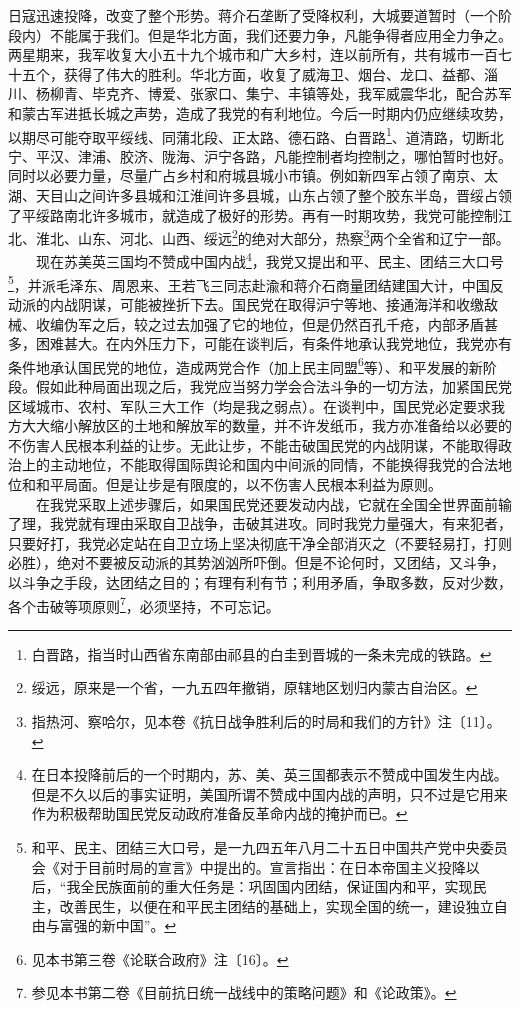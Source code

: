 \documentclass[cn,11pt,chinese]{elegantbook}
\begin{document}
日寇迅速投降，改变了整个形势。蒋介石垄断了受降权利，大城要道暂时（一个阶段内）不能属于我们。但是华北方面，我们还要力争，凡能争得者应用全力争之。两星期来，我军收复大小五十九个城市和广大乡村，连以前所有，共有城市一百七十五个，获得了伟大的胜利。华北方面，收复了威海卫、烟台、龙口、益都、淄川、杨柳青、毕克齐、博爱、张家口、集宁、丰镇等处，我军威震华北，配合苏军和蒙古军进抵长城之声势，造成了我党的有利地位。今后一时期内仍应继续攻势，以期尽可能夺取平绥线、同蒲北段、正太路、德石路、白晋路\footnote[1]{ 白晋路，指当时山西省东南部由祁县的白圭到晋城的一条未完成的铁路。}、道清路，切断北宁、平汉、津浦、胶济、陇海、沪宁各路，凡能控制者均控制之，哪怕暂时也好。同时以必要力量，尽量广占乡村和府城县城小市镇。例如新四军占领了南京、太湖、天目山之间许多县城和江淮间许多县城，山东占领了整个胶东半岛，晋绥占领了平绥路南北许多城市，就造成了极好的形势。再有一时期攻势，我党可能控制江北、淮北、山东、河北、山西、绥远\footnote[2]{ 绥远，原来是一个省，一九五四年撤销，原辖地区划归内蒙古自治区。}的绝对大部分，热察\footnote[3]{ 指热河、察哈尔，见本卷《抗日战争胜利后的时局和我们的方针》注〔11〕。}两个全省和辽宁一部。\\
　　现在苏美英三国均不赞成中国内战\footnote[4]{ 在日本投降前后的一个时期内，苏、美、英三国都表示不赞成中国发生内战。但是不久以后的事实证明，美国所谓不赞成中国内战的声明，只不过是它用来作为积极帮助国民党反动政府准备反革命内战的掩护而已。}，我党又提出和平、民主、团结三大口号\footnote[5]{ 和平、民主、团结三大口号，是一九四五年八月二十五日中国共产党中央委员会《对于目前时局的宣言》中提出的。宣言指出：在日本帝国主义投降以后，“我全民族面前的重大任务是：巩固国内团结，保证国内和平，实现民主，改善民生，以便在和平民主团结的基础上，实现全国的统一，建设独立自由与富强的新中国”。}，并派毛泽东、周恩来、王若飞三同志赴渝和蒋介石商量团结建国大计，中国反动派的内战阴谋，可能被挫折下去。国民党在取得沪宁等地、接通海洋和收缴敌械、收编伪军之后，较之过去加强了它的地位，但是仍然百孔千疮，内部矛盾甚多，困难甚大。在内外压力下，可能在谈判后，有条件地承认我党地位，我党亦有条件地承认国民党的地位，造成两党合作（加上民主同盟\footnote[6]{ 见本书第三卷《论联合政府》注〔16〕。}等）、和平发展的新阶段。假如此种局面出现之后，我党应当努力学会合法斗争的一切方法，加紧国民党区域城市、农村、军队三大工作（均是我之弱点）。在谈判中，国民党必定要求我方大大缩小解放区的土地和解放军的数量，并不许发纸币，我方亦准备给以必要的不伤害人民根本利益的让步。无此让步，不能击破国民党的内战阴谋，不能取得政治上的主动地位，不能取得国际舆论和国内中间派的同情，不能换得我党的合法地位和和平局面。但是让步是有限度的，以不伤害人民根本利益为原则。\\
　　在我党采取上述步骤后，如果国民党还要发动内战，它就在全国全世界面前输了理，我党就有理由采取自卫战争，击破其进攻。同时我党力量强大，有来犯者，只要好打，我党必定站在自卫立场上坚决彻底干净全部消灭之（不要轻易打，打则必胜），绝对不要被反动派的其势汹汹所吓倒。但是不论何时，又团结，又斗争，以斗争之手段，达团结之目的；有理有利有节；利用矛盾，争取多数，反对少数，各个击破等项原则\footnote[7]{ 参见本书第二卷《目前抗日统一战线中的策略问题》和《论政策》。}，必须坚持，不可忘记。\\
\end{document}
